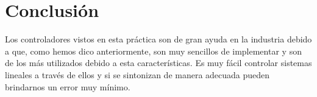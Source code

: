 \documentclass[12pt, letterpaper]{article}
\begin{document}
\section*{Conclusión}

Los controladores vistos en esta práctica son de gran ayuda en la industria debido a que, como hemos dico anteriormente, son muy sencillos de implementar y son de los más utilizados debido a esta características. Es muy fácil controlar sistemas lineales a través de ellos y si se sintonizan de manera adecuada pueden brindarnos un error muy mínimo.
\renewcommand\refname{Referencias}
\printbibliography
\end{document}
